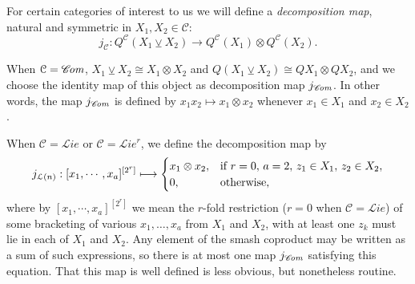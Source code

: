 \documentclass[11pt]{amsart} \renewcommand{\baselinestretch}{1.2}
\theoremstyle{plain}
\numberwithin{equation}{section} %
\theoremstyle{plain}
\numberwithin{equation}{chapter} %
\renewcommand{\to}{\longrightarrow}
\newcommand{\scrL}{\mathscr{L}}
\newcommand{\scrC}{\mathscr{C}}
\newcommand{\calL}{\mathcal{L}}
\newcommand{\calc}{\mathcal{C}}
\newcommand{\restnRepeated}[2]{#1^{[2^{#2}]}}
\newcommand{\crossterms}{\mathrm{cr}}
\newcommand{\algs}{{\scrC\!\textit{\normalfont\textit{om}}}}
\newcommand{\liealgs}{{\scrL\!\textit{ie}}}
\newcommand{\restliealgs}{{\scrL\!\textit{ie}^\textit{r}}}
\newcommand{\smashcoprod}{\veebar}%
\renewcommand{\mapsto}{\longmapsto}
\begin{document}
\begin{Pi-algebras and cohomology algebras}
%

For certain categories of interest to us we will define a \emph{decomposition map}, natural and symmetric in $X_1,X_2\in\calc$:
\[j_\calc:Q^\calc(X_1\smashcoprod X_2)\to Q^\calc(X_1)\otimes Q^\calc(X_2).\]

When $\calc=\algs$, $X_1\smashcoprod X_2\cong X_1\otimes X_2$ and $Q(X_1\smashcoprod X_2)\cong QX_1\otimes QX_2$, and we choose the identity map of this object as decomposition map $j_\algs$. In other words, the map $j_{\algs}$ is defined by $x_1x_2\mapsto x_1\otimes x_2$ whenever $x_1\in X_1$ and $x_2\in X_2$.

When $\calc=\liealgs$ or $\calc=\restliealgs$, we define the decomposition map by 
\[j_{\calL(n)}:\restnRepeated{[x_1,\cdots ,x_a]}{r}\longmapsto\begin{cases}
x_1\otimes x_2,&\textup{if }r=0,\,a=2,\,z_1\in X_1,\,z_2\in X_2,
\\0,&\textup{otherwise,}
\end{cases}\]
where by $\restnRepeated{[x_1,\cdots ,x_a]}{r}$ we mean the $r$-fold restriction ($r=0$ when $\calc=\liealgs$) of some bracketing of various $x_1,\ldots,x_a$ from $X_1$ and $X_2$, with at least one $z_k$ must lie in each of $X_1$ and $X_2$.  Any element of the smash coproduct may be written as a sum of such expressions, so there is at most one map $j_\algs$ satisfying this equation. That this map is well defined is less obvious, but nonetheless routine.



\end{Pi-algebras and cohomology algebras}
\end{document}
